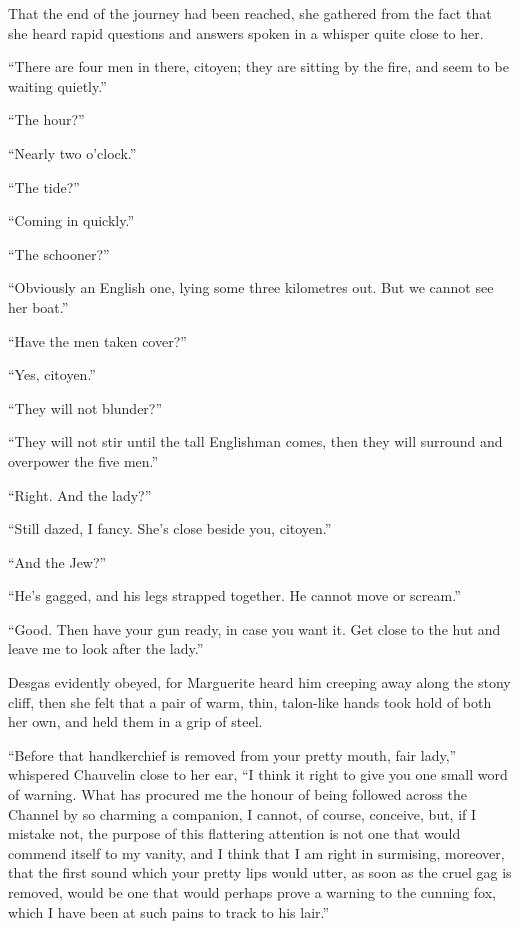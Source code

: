 \documentclass[paper=5.5in:8.5in,BCOR=7mm,twoside,DIV=calc,12pt,usegeometry,chapterprefix,endperiod,headings=big]{scrbook}
\begin{document}
That the end of the journey had been reached, she gathered from the fact that she heard rapid questions and answers spoken in a whisper quite close to her.

\enquote{There are four men in there, citoyen; they are sitting by the fire, and seem to be waiting quietly.}

\enquote{The hour?}

\enquote{Nearly two o'clock.}

\enquote{The tide?}

\enquote{Coming in quickly.}

\enquote{The schooner?}

\enquote{Obviously an English one, lying some three kilometres out. But we cannot see her boat.}

\enquote{Have the men taken cover?}

\enquote{Yes, citoyen.}

\enquote{They will not blunder?}

\enquote{They will not stir until the tall Englishman comes, then they will surround and overpower the five men.}

\enquote{Right. And the lady?}

\enquote{Still dazed, I fancy. She's close beside you, citoyen.}

\enquote{And the Jew?}

\enquote{He's gagged, and his legs strapped together. He cannot move or scream.}

\enquote{Good. Then have your gun ready, in case you want it. Get close to the hut and leave me to look after the lady.}

Desgas evidently obeyed, for Marguerite heard him creeping away along the stony cliff, then she felt that a pair of warm, thin, talon-like hands took hold of both her own, and held them in a grip of steel.

\enquote{Before that handkerchief is removed from your pretty mouth, fair lady,} whispered Chauvelin close to her ear, \enquote{I think it right to give you one small word of warning. What has procured me the honour of being followed across the Channel by so charming a companion, I cannot, of course, conceive, but, if I mistake not, the purpose of this flattering attention is not one that would commend itself to my vanity, and I think that I am right in surmising, moreover, that the first sound which your pretty lips would utter, as soon as the cruel gag is removed, would be one that would perhaps prove a warning to the cunning fox, which I have been at such pains to track to his lair.}
\end{document}
